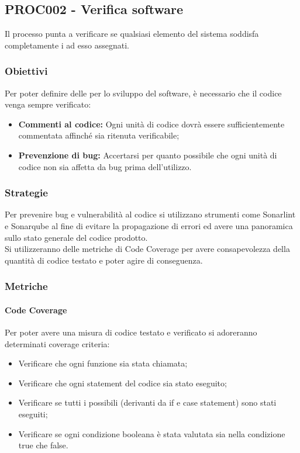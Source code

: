\documentclass[PianoDiQualifica.tex]{subfiles}
\begin{document}
\subsection{PROC002 - Verifica software}
Il processo punta a verificare se qualsiasi elemento del sistema soddisfa completamente i  ad esso assegnati.
\subsubsection{Obiettivi}
Per poter definire delle  per lo sviluppo del software, è necessario che il codice venga sempre verificato:
 \begin{itemize}
 	\item \textbf{Commenti al codice:} Ogni unità di codice dovrà essere sufficientemente commentata affinché sia ritenuta verificabile;
 	\item \textbf{Prevenzione di bug:} Accertarsi per quanto possibile che ogni unità di codice non sia affetta da bug prima dell'utilizzo.
 \end{itemize}
\subsubsection{Strategie}

Per prevenire bug e vulnerabilità al codice si utilizzano strumenti come Sonarlint e Sonarqube al fine di evitare la propagazione di errori ed avere una panoramica sullo stato generale del codice prodotto.\\
Si utilizzeranno delle metriche di Code Coverage per avere consapevolezza della quantità di codice testato e poter agire di conseguenza.
 
\subsubsection{Metriche}
\paragraph{Code Coverage}
Per poter avere una misura di codice testato e verificato si adoreranno determinati coverage criteria:

\begin{itemize}
	\item {} Verificare che ogni funzione sia stata chiamata;
	\item {} Verificare che ogni statement del codice sia stato eseguito; 
	\item {} Verificare se tutti i possibili  (derivanti da if e case statement) sono stati eseguiti;
	\item {} Verificare se ogni condizione booleana è stata valutata sia nella condizione true che false. 

\end{itemize}
\end{document}
